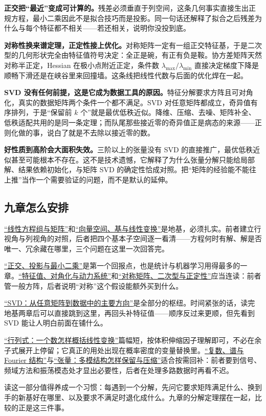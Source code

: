 \textbf{正交把``最近''变成可计算的。}残差必须垂直于列空间，这条几何事实直接生出正规方程，最小二乘因此不是拟合技巧而是投影。同一句话还解释了拟合之后残差为什么与每个特征都不相关——若还相关，说明你没投到底。

\textbf{对称性换来谱定理，正定性接上优化。}对称矩阵一定有一组正交特征基，于是二次型的几何形状完全由特征值符号决定：全正是碗，有正有负是鞍。协方差矩阵天然对称半正定，Hessian 在极小点附近正定，条件数 \(\lambda_{\max}/\lambda_{\min}\) 直接决定梯度下降是顺畅下滑还是在峡谷里来回撞墙。这条线把线性代数与后面的优化焊在一起。

\textbf{SVD 没有任何前提，这是它成为数据工具的原因。}特征分解要求方阵且可对角化，真实的数据矩阵两个条件一个都不满足。SVD 对任意矩阵都成立，奇异值有序排列，于是``保留前 \(k\) 个''就是最优低秩近似。降维、压缩、去噪、矩阵补全、低秩适配共用的是同一条定理；而队尾那些接近零的奇异值正是病态的来源——正则化做的事，说白了就是不去除以接近零的数。

\textbf{好性质到高阶会大面积失效。}三阶以上的张量没有 SVD 的直接推广，最优低秩近似甚至可能根本不存在。这不是技术遗憾，它解释了为什么张量分解只能给局部解、结果依赖初始化，与矩阵 SVD 的确定性恰成对照。把``矩阵的经验能不能往上推''当作一个需要验证的问题，而不是默认的延伸。

\subsection{九章怎么安排}

\hyperref[ch:016]{``线性方程组与矩阵''}和\hyperref[ch:017]{``向量空间、基与线性变换''}是地基，必须扎实。前者建立行视角与列视角的对照，后者把四个基本子空间逐一看清——方程何时有解、解是否唯一、冗余藏在哪里，三个问题在这里一次回答完。

\hyperref[ch:018]{``正交、投影与最小二乘''}是第一个回报点，也是统计与机器学习用得最多的一章。\hyperref[ch:020]{``特征值、对角化与动力系统''}和\hyperref[ch:021]{``对称矩阵、二次型与正定性''}应当连读：前者管一般方阵，后者说明``对称''这个假设能额外买到什么。

\hyperref[ch:022]{``SVD：从任意矩阵到数据中的主要方向''}是全部分的枢纽。时间紧张的话，读完地基两章后可以直接跳到这里，再回头补特征值——顺序反过来更顺，但先看到 SVD 能让人明白前面在铺什么。

\hyperref[ch:019]{``行列式：一个数怎样概括线性变换''}篇幅短，按体积伸缩因子理解即可，不必在余子式展开上停留；它真正的用处出现在概率密度的变量替换里。\hyperref[ch:023]{``复数、谱与 Fourier 结构''}与\hyperref[ch:024]{``张量：多模结构怎样保留与压缩''}适合按需回补：前者要到信号、频域方法和振荡模态处才显出必要性，后者在处理多路数据时再看不迟。

读这一部分值得养成一个习惯：每遇到一个分解，先问它要求矩阵满足什么、换到手的新基好在哪里、以及要求不满足时退化成什么。九章的分解定理摆在一起，比较的正是这三件事。

